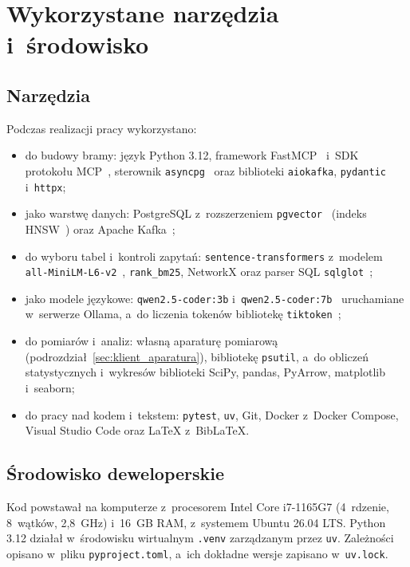 \section{Wykorzystane narzędzia i~środowisko}
\label{sec:wstep_narzedzia}

\subsection*{Narzędzia}

Podczas realizacji pracy wykorzystano:
\begin{itemize}
    \item do budowy bramy: język Python 3.12, framework FastMCP~\cite{fastmcp} i~SDK protokołu MCP~\cite{mcp_spec}, sterownik \texttt{asyncpg}~\cite{asyncpg} oraz biblioteki \texttt{aiokafka}, \texttt{pydantic} i~\texttt{httpx};
    \item jako warstwę danych: PostgreSQL z~rozszerzeniem \texttt{pgvector}~\cite{pgvector} (indeks HNSW~\cite{malkov2018hnsw}) oraz Apache Kafka~\cite{kreps2011kafka};
    \item do wyboru tabel i~kontroli zapytań: \texttt{sentence-transformers} z~modelem \texttt{all-MiniLM-L6-v2}~\cite{reimers2019sentencebert}, \texttt{rank\_bm25}, NetworkX oraz parser SQL \texttt{sqlglot}~\cite{sqlglot};
    \item jako modele językowe: \texttt{qwen2.5-coder:3b} i~\texttt{qwen2.5-coder:7b}~\cite{qwen2025qwen25} uruchamiane w~serwerze Ollama, a~do liczenia tokenów bibliotekę \texttt{tiktoken}~\cite{tiktoken};
    \item do pomiarów i~analiz: własną aparaturę pomiarową (podrozdział~\ref{sec:klient_aparatura}), bibliotekę \texttt{psutil}, a~do obliczeń statystycznych i~wykresów biblioteki SciPy, pandas, PyArrow, matplotlib i~seaborn;
    \item do pracy nad kodem i~tekstem: \texttt{pytest}, \texttt{uv}, Git, Docker z~Docker Compose, Visual Studio Code oraz \LaTeX{} z~BibLaTeX.
\end{itemize}

\subsection*{Środowisko deweloperskie}

Kod powstawał na komputerze z~procesorem Intel Core i7-1165G7 (4~rdzenie, 8~wątków, 2,8~GHz) i~16~GB RAM, z~systemem Ubuntu 26.04 LTS. Python 3.12 działał w~środowisku wirtualnym \texttt{.venv} zarządzanym przez \texttt{uv}. Zależności opisano w~pliku \texttt{pyproject.toml}, a~ich dokładne wersje zapisano w~\texttt{uv.lock}.

